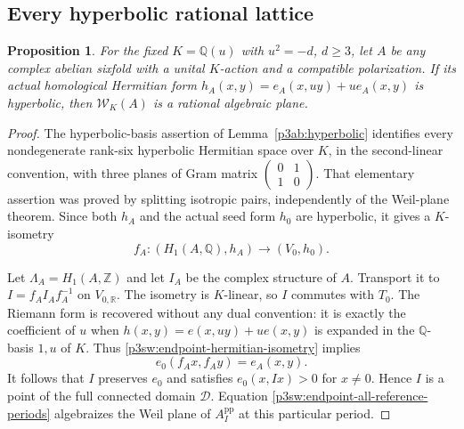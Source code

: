 \documentclass[11pt]{article}
\newcommand{\Q}{\mathbb Q}
\newcommand{\Z}{\mathbb Z}
\newcommand{\R}{\mathbb R}
\newtheorem{proposition}[theorem]{Proposition}
\numberwithin{equation}{section}
\begin{document}
\subsection{Every hyperbolic rational lattice}
\label{p3sw:all-periods}

\begin{proposition}
\label{p3sw:endpoint-all-lattices}
For the fixed \(K=\Q(u)\) with \(u^2=-d\), \(d\geq3\), let
\(A\) be any complex abelian sixfold with a unital \(K\)-action
and a compatible polarization.  If its actual homological
Hermitian form \(h_A(x,y)=e_A(x,uy)+u e_A(x,y)\) is hyperbolic,
then \(\mathcal W_K(A)\) is a rational algebraic plane.
\end{proposition}

\begin{proof}
The hyperbolic-basis assertion of Lemma~\ref{p3ab:hyperbolic}
identifies every nondegenerate rank-six hyperbolic Hermitian space
over \(K\), in the second-linear convention, with three planes
of Gram matrix
\(\left(\begin{smallmatrix}0&1\\1&0\end{smallmatrix}\right)\).
That elementary assertion was proved by splitting isotropic pairs,
independently of the Weil-plane theorem.  Since both \(h_A\) and
the actual seed form \(h_0\) are hyperbolic, it gives a \(K\)-isometry
\begin{equation}
\label{p3sw:endpoint-hermitian-isometry}
 f_A:(H_1(A,\Q),h_A)\longrightarrow(V_0,h_0).
\end{equation}

Let \(\Lambda_A=H_1(A,\Z)\) and let \(I_A\) be the complex
structure of \(A\).  Transport it to
\(I=f_AI_Af_A^{-1}\) on \(V_{0,\R}\).  The isometry is \(K\)-linear,
so \(I\) commutes with \(T_0\).  The Riemann form is recovered
without any dual convention: it is exactly the coefficient of
\(u\) when \(h(x,y)=e(x,uy)+u e(x,y)\) is expanded in the
\(\Q\)-basis \(1,u\) of \(K\).  Thus
\eqref{p3sw:endpoint-hermitian-isometry} implies
\[
 e_0(f_Ax,f_Ay)=e_A(x,y).
\]
It follows that \(I\) preserves \(e_0\) and satisfies
\(e_0(x,Ix)>0\) for \(x\ne0\).  Hence \(I\) is a point of the
full connected domain \(\mathscr D\).  Equation
\eqref{p3sw:endpoint-all-reference-periods} algebraizes the
Weil plane of \(A_I^{\mathrm{pp}}\) at this particular period.


\end{proof}
\end{document}
